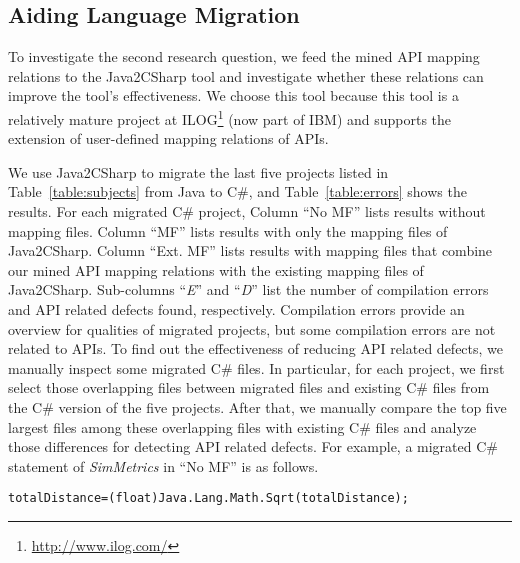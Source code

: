 \subsection{Aiding Language Migration}
\label{sec:evaluation:migration}

To investigate the second research question, we feed the
mined API mapping relations to the Java2CSharp tool and
investigate whether these relations can improve the tool's
effectiveness. We choose this tool because this tool is a relatively
mature project at ILOG\footnote{\url{http://www.ilog.com/}} (now
part of IBM) and supports the extension of user-defined mapping
relations of APIs.

We use Java2CSharp to migrate the last five projects listed in
Table~\ref{table:subjects} from Java to C\#, and
Table~\ref{table:errors} shows the results. For each migrated C\#
project, Column ``No MF'' lists results without mapping files.
Column ``MF'' lists results with only the mapping files of Java2CSharp.
Column ``Ext. MF'' lists results with mapping files that combine
our mined API mapping relations with the existing mapping files of Java2CSharp.
Sub-columns ``\emph{E}'' and ``\emph{D}'' list the number of
compilation errors and API related defects found, respectively. Compilation errors provide an overview for qualities of migrated projects, but some compilation errors are not related to APIs.
To find out the effectiveness of reducing API related defects, we manually inspect some migrated C\# files. In particular, for each project,
we first select those overlapping files between migrated files and existing C\# files
from the C\# version of the five projects. After that, we manually compare
the top five largest files among these overlapping files with existing C\# files and analyze those differences for detecting API related defects. For example, a migrated C\# statement of \emph{SimMetrics} in ``No MF'' is as follows.

\begin{CodeOut}\vspace*{-1.8ex}
\begin{alltt}
 totalDistance = (float)Java.Lang.Math.Sqrt(totalDistance);
\end{alltt}
\end{CodeOut}\vspace*{-1.8ex}


